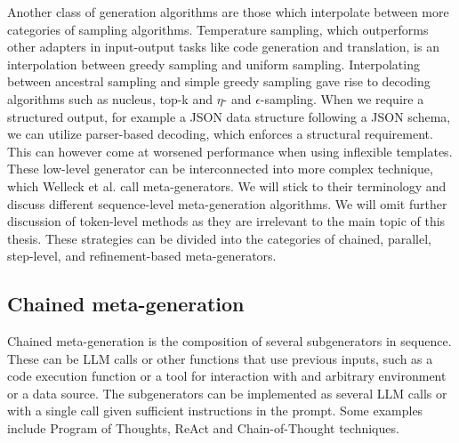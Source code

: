 Another class of generation algorithms are those which interpolate between more categories of sampling algorithms.
Temperature sampling, which outperforms other adapters in input-output tasks like code generation and translation,
is an interpolation between greedy sampling and uniform sampling. 
Interpolating between ancestral sampling and simple greedy sampling gave rise to decoding algorithms such as
nucleus, top-k and $\eta$- and $\epsilon$-sampling. When we require a structured output, for example a JSON data 
structure following a JSON schema, we can utilize parser-based decoding, which enforces a structural requirement.
This can however come at worsened performance when using inflexible templates.
\newpage
These low-level generator can be interconnected into more complex technique, which Welleck et al. call meta-generators\cite{welleck2024decodingmetagenerationinferencetimealgorithms}.
We will stick to their terminology and discuss different sequence-level meta-generation algorithms. We will omit further discussion of token-level methods as
they are irrelevant to the main topic of this thesis. These strategies can be divided into the categories of chained, parallel, step-level, and refinement-based meta-generators.

\subsection{Chained meta-generation}

Chained meta-generation is the composition of several subgenerators in sequence. 
These can be LLM calls or other functions that use previous inputs, such as a code execution function\cite{chen2023programthoughtspromptingdisentangling}
or a tool for interaction with and arbitrary environment or a data source\cite{yao2023reactsynergizingreasoningacting}.
The subgenerators can be implemented as several LLM calls or with a single call given sufficient instructions in the prompt. \cite{khattab2023dspycompilingdeclarativelanguage}
Some examples include Program of Thoughts\cite{chen2023programthoughtspromptingdisentangling}, ReAct\cite{yao2023reactsynergizingreasoningacting} 
and Chain-of-Thought\cite{NEURIPS2022_8bb0d291}\cite{wei2023chainofthoughtpromptingelicitsreasoning} techniques.

